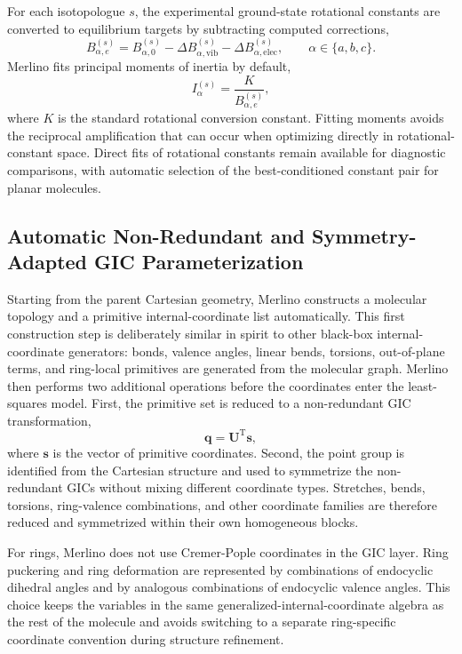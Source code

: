 \documentclass[journal=jctcce,manuscript=article,maxauthors=999]{achemso}
\begin{document}
For each isotopologue $s$, the experimental ground-state rotational constants are converted to equilibrium targets by subtracting computed corrections,
\begin{equation}
B_{\alpha,e}^{(s)} = B_{\alpha,0}^{(s)}
- \Delta B_{\alpha,\mathrm{vib}}^{(s)}
- \Delta B_{\alpha,\mathrm{elec}}^{(s)},
\qquad \alpha \in \{a,b,c\}.
\end{equation}
Merlino fits principal moments of inertia by default,
\begin{equation}
I_{\alpha}^{(s)} = \frac{K}{B_{\alpha,e}^{(s)}},
\end{equation}
where $K$ is the standard rotational conversion constant. Fitting moments avoids the reciprocal amplification that can occur when optimizing directly in rotational-constant space. Direct fits of rotational constants remain available for diagnostic comparisons, with automatic selection of the best-conditioned constant pair for planar molecules.

\subsection{Automatic Non-Redundant and Symmetry-Adapted GIC Parameterization}

Starting from the parent Cartesian geometry, Merlino constructs a molecular topology and a primitive internal-coordinate list automatically. This first construction step is deliberately similar in spirit to other black-box internal-coordinate generators: bonds, valence angles, linear bends, torsions, out-of-plane terms, and ring-local primitives are generated from the molecular graph. Merlino then performs two additional operations before the coordinates enter the least-squares model. First, the primitive set is reduced to a non-redundant GIC transformation,
\begin{equation}
\mathbf{q} = \mathbf{U}^{\mathrm{T}}\mathbf{s},
\end{equation}
where $\mathbf{s}$ is the vector of primitive coordinates. Second, the point group is identified from the Cartesian structure and used to symmetrize the non-redundant GICs without mixing different coordinate types. Stretches, bends, torsions, ring-valence combinations, and other coordinate families are therefore reduced and symmetrized within their own homogeneous blocks.

For rings, Merlino does not use Cremer-Pople coordinates in the GIC layer. Ring puckering and ring deformation are represented by combinations of endocyclic dihedral angles and by analogous combinations of endocyclic valence angles. This choice keeps the variables in the same generalized-internal-coordinate algebra as the rest of the molecule and avoids switching to a separate ring-specific coordinate convention during structure refinement.
\end{document}
